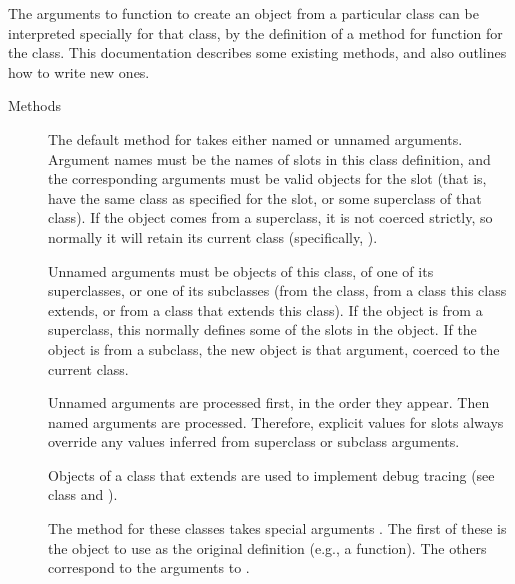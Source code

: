 %
\begin{Description}\relax
The arguments to function  to create an object from a
particular class can be interpreted specially for that class, by the
definition of a method for function  for the class.
This documentation describes some existing methods, and also outlines
how to write new ones.
\end{Description}
%
\begin{Section}{Methods}
\begin{description}

\item[] 
The default method for  takes either named or
unnamed arguments.  Argument names must be the names of slots in
this class definition, and the corresponding arguments must be
valid objects for the slot (that is, have the same class as
specified for the slot, or some superclass of that class).  If the
object comes from a superclass, it is not coerced strictly, so
normally it will retain its current class (specifically,
).

Unnamed arguments must be objects of this class, of one of its
superclasses, or one of its subclasses (from the class, from a
class this class extends, or from a class that extends this
class). If the object is from a superclass, this normally defines
some of the slots in the object.  If the object is from a
subclass, the new object is that argument, coerced to the current
class.

Unnamed arguments are processed first, in the order they appear.
Then named arguments are processed.  Therefore, explicit values
for slots always override any values inferred from superclass or
subclass arguments.


\item[] 
Objects of a class that extends  are used to
implement debug tracing (see class  and
).

The  method for these classes takes special
arguments .  The first of these
is the object to use as the original definition (e.g., a
function).  The others correspond to the arguments to
.



\end{description}
\end{Section}
